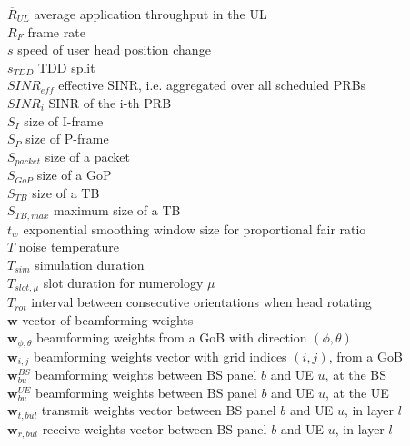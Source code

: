 $\overline{R}_{UL}$ \mytab average application throughput in the \acs{UL}\\
$R_F$ \mytab frame rate \\
$s$ \mytab speed of user head position change \\
$s_{TDD}$ \mytab \acs{TDD} split \\
$SINR_{eff}$ \mytab effective \acs{SINR}, i.e. aggregated over all scheduled PRBs \\
$SINR_i$ \mytab SINR of the i-th \acs{PRB} \\
$S_I$ \mytab size of I-frame\\
$S_P$ \mytab size of P-frame\\
$S_{packet}$ \mytab size of a packet\\
$S_{GoP}$ \mytab size of a \acs{GoP}\\
$S_{TB}$ \mytab size of a \acs{TB}\\
$S_{TB, max}$ \mytab maximum size of a \acs{TB}\\
$t_w$ \mytab exponential smoothing window size for proportional fair ratio \\
$T$ \mytab noise temperature\\
$T_{sim}$ \mytab simulation duration\\
$T_{slot, \mu}$ \mytab slot duration for numerology $\mu$\\
$T_{rot}$ \mytab interval between consecutive orientations when head rotating\\
$\bm{w}$ \mytab vector of beamforming weights \\
$\bm{w}_{\phi, \theta}$ \mytab beamforming weights from a GoB with direction $(\phi, \theta)$ \\
$\bm{w}_{i,j}$ \mytab beamforming weights vector with grid indices $(i,j)$, from a GoB\\
$\bm{w}^{BS}_{bu}$ \mytab beamforming weights between BS panel $b$ and UE $u$, at the BS \\
$\bm{w}^{UE}_{bu}$ \mytab beamforming weights between BS panel $b$ and UE $u$, at the UE \\
$\bm{w}_{t, bul}$ \mytab transmit weights vector between BS panel $b$ and UE $u$, in layer $l$\\
$\bm{w}_{r, bul}$ \mytab receive weights vector between BS panel $b$ and UE $u$, in layer $l$\\

